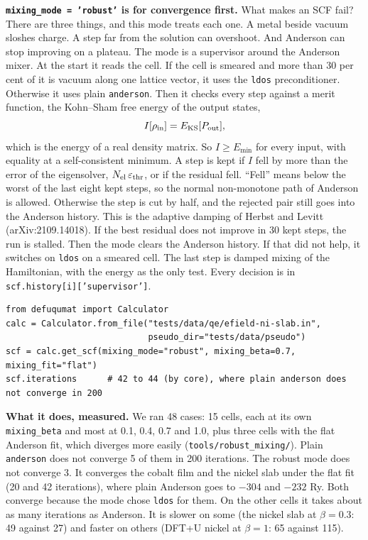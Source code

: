 \documentclass[11pt,a4paper]{article}
\newcommand{\code}[1]{\texttt{\small #1}}
\begin{document}
\textbf{\code{mixing\_mode = 'robust'} is for convergence first.} What makes an SCF
fail? There are three things, and this mode treats each one. A metal beside vacuum
sloshes charge. A step far from the solution can overshoot. And Anderson can stop
improving on a plateau. The mode is a supervisor around the Anderson mixer. At the
start it reads the cell. If the cell is smeared and more than 30 per cent of it is
vacuum along one lattice vector, it uses the \code{ldos} preconditioner. Otherwise it
uses plain \code{anderson}. Then it checks every step against a merit function, the
Kohn--Sham free energy of the output states,
\begin{equation*}
  I[\rho_{\rm in}] = E_{\rm KS}[P_{\rm out}],
\end{equation*}
which is the energy of a real density matrix. So $I \ge E_{\min}$ for every input,
with equality at a self-consistent minimum. A step is kept if $I$ fell by more than
the error of the eigensolver, $N_{\rm el}\,\varepsilon_{\rm thr}$, or if the residual
fell. ``Fell'' means below the worst of the last eight kept steps, so the normal
non-monotone path of Anderson is allowed. Otherwise the step is cut by half, and the
rejected pair still goes into the Anderson history. This is the adaptive damping of
Herbst and Levitt (arXiv:2109.14018). If the best residual does not improve in 30
kept steps, the run is stalled. Then the mode clears the Anderson history. If that
did not help, it switches on \code{ldos} on a smeared cell. The last step is damped
mixing of the Hamiltonian, with the energy as the only test. Every decision is in
\code{scf.history[i]['supervisor']}.
\begin{verbatim}
from defuqumat import Calculator
calc = Calculator.from_file("tests/data/qe/efield-ni-slab.in",
                            pseudo_dir="tests/data/pseudo")
scf = calc.get_scf(mixing_mode="robust", mixing_beta=0.7, mixing_fit="flat")
scf.iterations      # 42 to 44 (by core), where plain anderson does not converge in 200
\end{verbatim}

\textbf{What it does, measured.} We ran 48 cases: 15 cells, each at its own
\code{mixing\_beta} and most at 0.1, 0.4, 0.7 and 1.0, plus three cells with the flat
Anderson fit, which diverges more easily (\code{tools/robust\_mixing/}). Plain
\code{anderson} does not converge 5 of them in 200 iterations. The robust mode does
not converge 3. It converges the cobalt film and the nickel slab under the flat fit
(20 and 42 iterations), where plain Anderson goes to $-304$ and $-232$ Ry. Both
converge because the mode chose \code{ldos} for them. On the other cells it takes
about as many iterations as Anderson. It is slower on some (the nickel slab at
$\beta = 0.3$: 49 against 27) and faster on others (DFT+U nickel at $\beta = 1$:
65 against 115).
\end{document}
